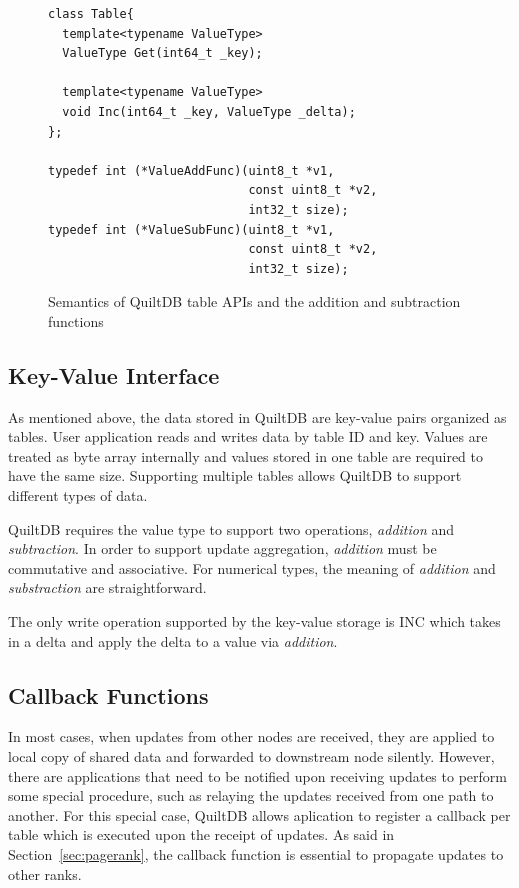 \documentclass{acm_proc_article-sp}
\begin{document}
\begin{figure}[th!]
\begin{verbatim}
class Table{
  template<typename ValueType>
  ValueType Get(int64_t _key);
  
  template<typename ValueType>
  void Inc(int64_t _key, ValueType _delta);
};

typedef int (*ValueAddFunc)(uint8_t *v1, 
                            const uint8_t *v2,
                            int32_t size);
typedef int (*ValueSubFunc)(uint8_t *v1, 
                            const uint8_t *v2,
                            int32_t size);

\end{verbatim}
\caption{Semantics of QuiltDB table APIs and the addition and subtraction 
  functions}
\end{figure}

\subsection{Key-Value Interface}

As mentioned above, the data stored in QuiltDB are key-value pairs organized 
as tables. User application reads and writes data by table ID and key. Values 
are treated as byte array internally and values stored in one table are required
 to have the same size. Supporting multiple tables allows QuiltDB to support 
different types of data.

QuiltDB requires the value type to support two operations, \emph{addition} and 
\emph{subtraction}. In order to support update aggregation, \emph{addition} must
 be commutative and associative. For numerical types,  the meaning of 
\emph{addition} and \emph{substraction} are straightforward.

The only write operation supported by the key-value storage is INC which takes 
in a delta and apply the delta to a value via \emph{addition}.

\subsection{Callback Functions}
\label{sec:callback}

In most cases, when updates from other nodes are received, they are applied to 
local copy of shared data and forwarded to downstream node silently. 
However, there are applications that need to be notified upon receiving updates 
to perform some special procedure, such as relaying the updates received from 
one path to another. For this special case, QuiltDB allows aplication to 
register a callback per table which is executed upon the receipt of updates. As 
said in Section~\ref{sec:pagerank}, the callback function is essential to 
propagate updates to other ranks.
\end{document}
